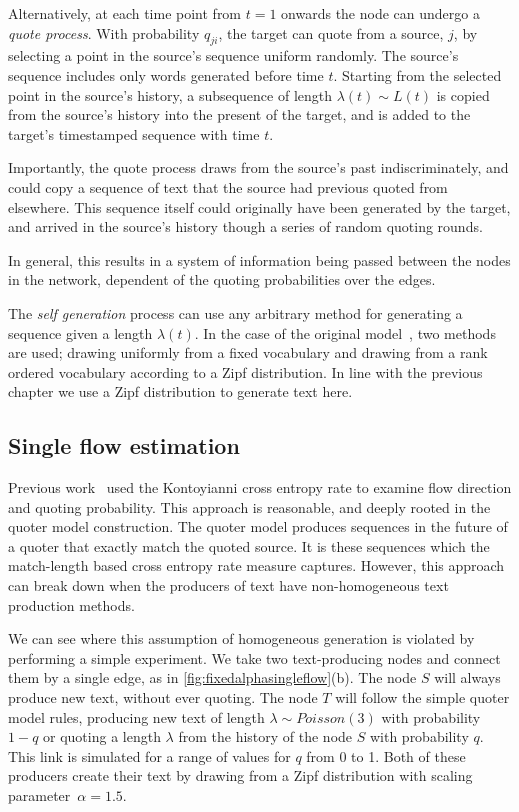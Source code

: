 Alternatively, at each time point from $t=1$ onwards the node can undergo a \emph{quote process}. With probability $q_{ji}$, the target can quote from a source, $j$, by selecting a point in the source's sequence uniform randomly. The source's sequence includes only words generated before time $t$. Starting from the selected point in the source's history, a subsequence of length $\lambda(t) \sim L(t)$ is copied from the source's history into the present of the target, and is added to the target's timestamped sequence with time $t$.

Importantly, the quote process draws from the source's past indiscriminately, and could copy a sequence of text that the source had previous quoted from elsewhere. This sequence itself could originally have been generated by the target, and arrived in the source's history though a series of random quoting rounds. 

In general, this results in a system of information being passed between the nodes in the network, dependent of the quoting probabilities over the edges.

The \emph{self generation} process can use any arbitrary method for generating a sequence given a length $\lambda(t)$. In the case of the original model~\cite{bagrow_quoter_2018}, two methods are used; drawing uniformly from a fixed vocabulary and drawing from a rank ordered vocabulary according to a Zipf distribution. In line with the previous chapter we use a Zipf distribution to generate text here.


\subsection{Single flow estimation} 

Previous work~\cite{bagrow_quoter_2018} used the Kontoyianni cross entropy rate to examine flow direction and quoting probability. This approach is reasonable, and deeply rooted in the quoter model construction. The quoter model produces sequences in the future of a quoter that exactly match the quoted source. It is these sequences which the match-length based cross entropy rate measure captures. However, this approach can break down when the producers of text have non-homogeneous text production methods.

We can see where this assumption of homogeneous generation is violated by performing a simple experiment. We take two text-producing nodes and connect them by a single edge, as in \autoref{fig:fixedalphasingleflow}(b). The node $S$ will always produce new text, without ever quoting. The node $T$ will follow the simple quoter model rules, producing new text of length $\lambda \sim Poisson(3)$ with probability $1-q$ or quoting a length $\lambda$ from the history of the node $S$ with probability $q$. This link is simulated for a range of values for $q$ from 0 to 1. Both of these producers create their text by drawing from a Zipf distribution with scaling parameter~$\alpha=1.5$.

